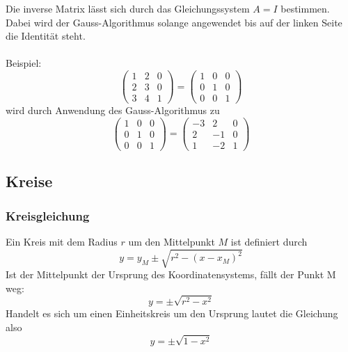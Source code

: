 Die inverse Matrix lässt sich durch das Gleichungssystem $A = I$ bestimmen. Dabei wird der Gauss-Algorithmus solange
angewendet bis auf der linken Seite die Identität steht.\\\\
Beispiel:
\begin{displaymath}
	\left(\begin{matrix}1 & 2 & 0\\2 & 3 & 0 \\ 3 & 4 & 1\end{matrix}\right) = 
	\left(\begin{matrix}1 & 0 & 0\\0 & 1 & 0 \\ 0 & 0 & 1\end{matrix}\right)
\end{displaymath}
wird durch Anwendung des Gauss-Algorithmus zu
\begin{displaymath}
	\left(\begin{matrix}1 & 0 & 0\\0 & 1 & 0 \\ 0 & 0 & 1\end{matrix}\right) = 
	\left(\begin{matrix}-3 & 2 & 0\\2 & -1 & 0 \\ 1 & -2 & 1\end{matrix}\right)
\end{displaymath}

\subsection{Kreise} 
\label{sub:kreise}

\subsubsection{Kreisgleichung} 
\label{ssub:kreisgleichung}

Ein Kreis mit dem Radius $r$ um den Mittelpunkt $M$ ist definiert durch
\begin{equation}
	y = y_M \pm \sqrt{r^2 - (x-x_M)^2}
\end{equation}
Ist der Mittelpunkt der Ursprung des Koordinatensystems, fällt der Punkt M weg:
\begin{displaymath}
	y = \pm \sqrt{r^2-x^2}
\end{displaymath}
Handelt es sich um einen Einheitskreis um den Ursprung lautet die Gleichung also
\begin{displaymath}
	y = \pm \sqrt{1-x^2}
\end{displaymath}
